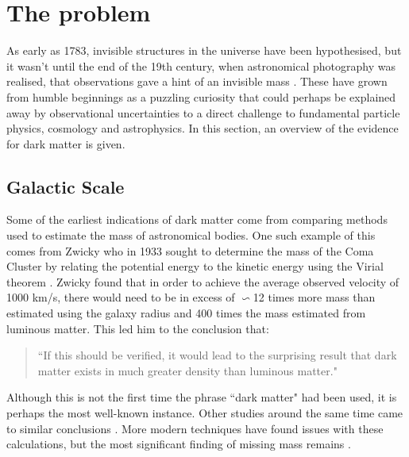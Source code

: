 \section{The problem}

\par
As early as 1783, invisible structures in the universe have been hypothesised, but it wasn't until the end of the 19th century, when astronomical photography was realised, that observations gave a hint of an invisible mass \cite{History_Of_Dark_Matter_2018_ref}.
These have grown from humble beginnings as a puzzling curiosity that could perhaps be explained away by observational uncertainties to a direct challenge to fundamental particle physics, cosmology and astrophysics.
In this section, an overview of the evidence for dark matter is given.

%
%


\subsection{Galactic Scale}

\par
Some of the earliest indications of dark matter come from comparing methods used to estimate the mass of astronomical bodies.
One such example of this comes from Zwicky who in 1933 sought to determine the mass of the Coma Cluster by relating the potential energy to the kinetic energy using the Virial theorem \cite{Fritz_Zwicky_1933_ref}.
Zwicky found that in order to achieve the average observed velocity of 1000 km/s, there would need to be in excess of $\backsim$12 times more mass than estimated using the galaxy radius and 400 times the mass estimated from luminous matter.
This led him to the conclusion that:
\begin{quote}
``If this should be verified, it would lead to the surprising result that dark matter
exists in much greater density than luminous matter."
\end{quote}
Although this is not the first time the phrase ``dark matter" had been used, it is perhaps the most well-known instance.
Other studies around the same time came to similar conclusions \cite{hubble_and_co_viral_theorem_ref}.
More modern techniques have found issues with these calculations, but the most significant finding of missing mass remains \cite{a_second_history_of_dark_matter_ref}.

